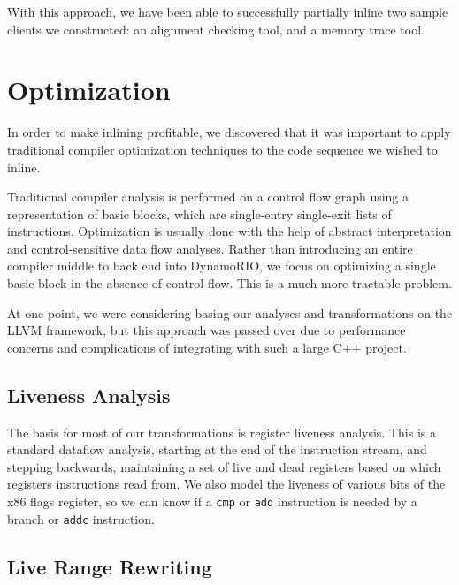 With this approach, we have been able to successfully partially inline two
sample clients we constructed: an alignment checking tool, and a memory trace
tool.


\section{Optimization}

In order to make inlining profitable, we discovered that it was important to
apply traditional compiler optimization techniques to the code sequence we
wished to inline.

Traditional compiler analysis is performed on a control flow graph using a
representation of basic blocks, which are single-entry single-exit lists of
instructions.  Optimization is usually done with the help of abstract
interpretation and control-sensitive data flow analyses.  Rather than
introducing an entire compiler middle to back end into DynamoRIO, we focus on
optimizing a single basic block in the absence of control flow.  This is a much
more tractable problem.

At one point, we were considering basing our analyses and transformations on the
LLVM\cite{llvm} framework, but this approach was passed over due to performance
concerns and complications of integrating with such a large C++ project.


\subsection{Liveness Analysis}
\label{sec:liveness}

The basis for most of our transformations is register liveness analysis.  This
is a standard dataflow analysis, starting at the end of the instruction stream,
and stepping backwards, maintaining a set of live and dead registers based on
which registers instructions read from.  We also model the liveness of various
bits of the x86 flags register, so we can know if a {\tt cmp} or {\tt add}
instruction is needed by a branch or {\tt addc} instruction.

\subsection{Live Range Rewriting}

